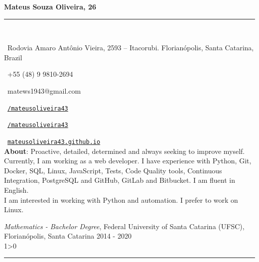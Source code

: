 \documentclass[a4paper,10pt]{article}
\makeatletter
\newcommand{\professional}{Mateus Souza Oliveira}
\newcommand{\age}{26}
\newcommand{\address}{Rodovia Amaro Antônio Vieira, 2593 -- Itacorubi. Florianópolis, Santa Catarina, Brazil}
\newcommand{\phone}{+55 (48) 9 9810-2694}
\newcommand{\email}{matews1943@gmail.com}
\newcommand{\about}{
    Proactive, detailed, determined and always seeking to improve myself. Currently, I am working as a web developer. I have experience with Python, Git, Docker, SQL, Linux, JavaScript, Tests, Code Quality tools, Continuous Integration, PostgreSQL and GitHub, GitLab and Bitbucket. I am fluent in English.\\

    I am interested in working with Python and automation. I prefer to work on Linux.
	\vspace{\baselineskip}
}
\newcommand{\createSection}[4][0]{
	\begin{tcolorbox}[
        blanker,
        breakable,
        title=\begin{minipage}{0.16\linewidth}\large{\textbf{#2}}\vspace{-#3\baselineskip}\end{minipage},
        coltitle=black,
        leftupper=0.21\linewidth,
    ]
        #4
		\ifnum0#1>0 { \hrule {\ } } \fi
    \end{tcolorbox}
}
\makeatother
\begin{document}
	\begin{minipage}{0.65\linewidth}
		\Huge{\bf \professional, \age}\\\vspace{-1.75\baselineskip}

		\noindent\rule{\textwidth}{1.5pt} {\ }\\\vspace{-1.8\baselineskip}

		\large{
		\faMapMarker \ \address \\
		\begin{minipage}{0.5\linewidth}
			\faWhatsapp \ \phone
		\end{minipage}
		\begin{minipage}{0.5\linewidth}
			\faEnvelope \ \email
		\end{minipage}
		\begin{minipage}{0.5\linewidth}
			\faLinkedinSquare \ \href{https://www.linkedin.com/in/mateusoliveira43/}{\texttt{/mateusoliveira43}}
		\end{minipage}
		\begin{minipage}{0.5\linewidth}
			\faGithub \ \href{https://github.com/mateusoliveira43}{\texttt{/mateusoliveira43}}
		\end{minipage}
		\faLink \ \href{https://mateusoliveira43.github.io/}{\texttt{mateusoliveira43.github.io}}\\
		\vfill
		\textbf{About}:\about
		}
	\end{minipage}
	\vspace{\baselineskip}

    \createSection[1]{Education}{2}{
		\textit{Mathematics - Bachelor Degree}, Federal University of Santa Catarina (UFSC), Florianópolis, Santa Catarina \hfill 2014 - 2020 \\
	}
\end{document}
